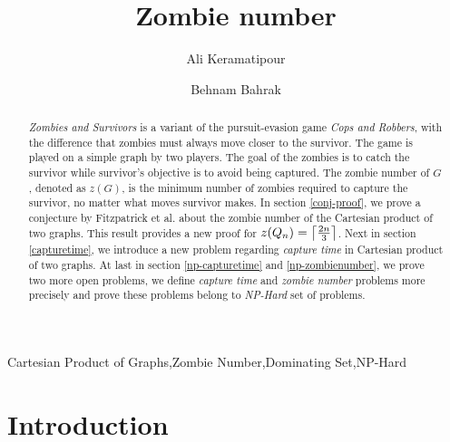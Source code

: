 \documentclass[1p]{elsarticle}
\DeclarePairedDelimiter\ceil{\lceil}{\rceil} \DeclarePairedDelimiter\floor{\lfloor}{\rfloor}
\begin{document}
	
	\begin{frontmatter}
		
		\title{Zombie number}
		
		
		\author{Ali Keramatipour}
		
		\author{Behnam Bahrak}
		
		\address{School of Electrical and Computer Engineering, College of Engineering, University of Tehran, Tehran, Iran}
		
		\begin{abstract}
		{\it Zombies and Survivors} is a variant of the pursuit-evasion game {\it Cops and Robbers}, with the difference
		that zombies must always move closer to the survivor. The game is played on a simple graph by two players. The
		goal of the zombies is to catch the survivor while survivor's objective is to avoid being captured. The zombie
		number of $G$, denoted as $z(G)$, is the minimum number of zombies required to capture the survivor, no matter
		what moves survivor makes. In section \ref{conj-proof}, we prove a conjecture by Fitzpatrick et al.\cite{Fitz16} about the
		zombie number of the Cartesian product of two graphs.  This result provides a new proof for $z(Q_n) =
		\ceil*{\frac{2n}{3}}$. Next in section \ref{capturetime}, we introduce a new problem regarding {\it capture time}
		in Cartesian product of two graphs. At last in section \ref{np-capturetime} and \ref{np-zombienumber}, we prove
		two more open problems, we define {\it capture time} and {\it zombie number} problems more precisely and prove these
		problems belong to {\it NP-Hard} set of problems. 
		\end{abstract}
		
		\begin{keyword}
			Cartesian Product of Graphs\sep Zombie Number\sep Dominating Set\sep NP-Hard
		\end{keyword}
		
	\end{frontmatter}
	
\section{Introduction}\label{section-introduction}
\end{document}
